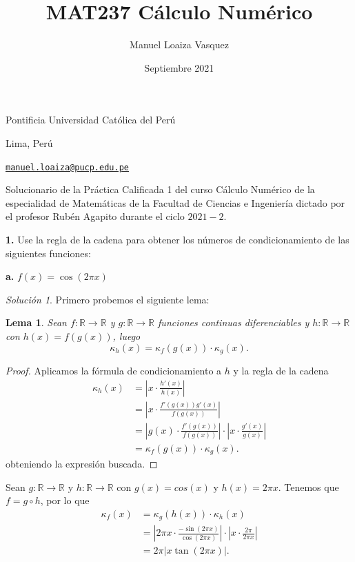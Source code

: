 \documentclass{article}
\title{MAT237 C\'alculo Num\'erico}
\author{Manuel Loaiza Vasquez}
\date{Septiembre 2021}
\newenvironment{statement}[1]{\smallskip\noindent\color[rgb]{1.00,0.00,0.50} {\bf #1.}}{}
\newtheorem{lemma}[theorem]{Lema}
\theoremstyle{definition}
\theoremstyle{remark}
\newtheorem*{solution}{Soluci\'on}
\newcommand{\BR}{\mathbb R}
\begin{document}
\maketitle

\vspace*{-0.25in}
\centerline{Pontificia Universidad Cat\'olica del Per\'u}
\centerline{Lima, Per\'u}
\centerline{\href{mailto:manuel.loaiza@pucp.edu.pe}{{\tt manuel.loaiza@pucp.edu.pe}}}
\vspace*{0.15in}

\begin{framed}
  Solucionario de la Pr\'actica Calificada 1 del curso C\'alculo Num\'erico
  de la especialidad de Matem\'aticas de la Facultad de Ciencias e Ingenier\'ia
  dictado por el profesor Rub\'en Agapito durante el ciclo $2021-2$.
\end{framed}

\begin{statement}{1}
  Use la regla de la cadena para obtener los n\'umeros de condicionamiento de
  las siguientes funciones:
\end{statement}

\begin{statement}{a}
  $f(x) = \cos(2 \pi x)$
\end{statement}

\begin{solution}
  Primero probemos el siguiente lema:

  \begin{lemma}
    \label{lemma01}
    Sean $f:\BR \to \BR$ y $g:\BR \to \BR$ funciones continuas diferenciables y
    $h: \BR \to \BR$ con $h(x) = f(g(x))$, luego
    \[
      \kappa_h(x) = \kappa_f(g(x)) \cdot \kappa_g(x).
    \]
  \end{lemma}

  \begin{proof}
    Aplicamos la f\'ormula de condicionamiento a $h$ y la regla de la cadena
    \begin{align*}
      \kappa_h(x) &= \left|x \cdot \frac{h'(x)}{h(x)}\right|\\
      &= \left|x \cdot \frac{f'(g(x)) g'(x)}{f(g(x))}\right|\\
      &= \left|g(x) \cdot \frac{f'(g(x))}{f(g(x))}\right| \cdot \left|x \cdot \frac{g'(x)}{g(x)}\right|\\
      &= \kappa_f(g(x)) \cdot \kappa_g(x).
    \end{align*}
    obteniendo la expresi\'on buscada.
  \end{proof}

  Sean $g: \BR \to \BR$ y $h: \BR \to \BR$ con $g(x) = cos(x)$ y $h(x) = 2 \pi x$.
  Tenemos que $f = g \circ h$, por lo que
  \begin{align*}
    \kappa_f(x) &= \kappa_g(h(x)) \cdot \kappa_h(x)\\
    &= \left|2 \pi x \cdot \frac{-\sin(2 \pi x)}{\cos(2 \pi x)}\right| \cdot \left|x \cdot \frac{2 \pi}{2 \pi x}\right|\\
    &= 2\pi|x \tan(2 \pi x)|.
  \end{align*}
\end{solution}
\end{document}
